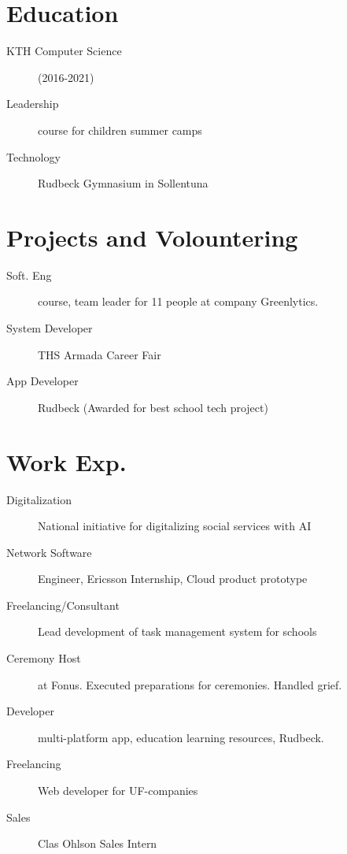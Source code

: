 \documentclass[margin,line,a4paper]{resume}
\begin{document}
\begin{resume}
\section{\mysidestyle Education}\vspace{1mm}
    \begin{description}
        \item[KTH Computer Science] (2016-2021)
         \item[Leadership] course for children summer camps
        \item[Technology] Rudbeck Gymnasium in Sollentuna
    \end{description} 

\section{\mysidestyle Projects and Volountering}\vspace{1mm}
\begin{description}
    \item[Soft. Eng] course, team leader for 11 people at company Greenlytics.   
     \item[System Developer] THS Armada Career Fair
    \item[App Developer] Rudbeck (Awarded for best school tech project) 

\end{description}  
  
\section{\mysidestyle Work Exp.}\vspace{1mm}
\begin{description}
    \item[Digitalization] National initiative for digitalizing social services with AI
    \item[Network Software] Engineer, Ericsson Internship, Cloud product prototype
    \item[Freelancing/Consultant] Lead development of task management system for schools
    \item[Ceremony Host] at Fonus. Executed preparations for ceremonies. Handled grief.
    \item[Developer] multi-platform app, education learning resources, Rudbeck.
    \item[Freelancing] Web developer for UF-companies
    \item[Sales] Clas Ohlson Sales Intern
\end{description}


\end{resume}
\end{document}
